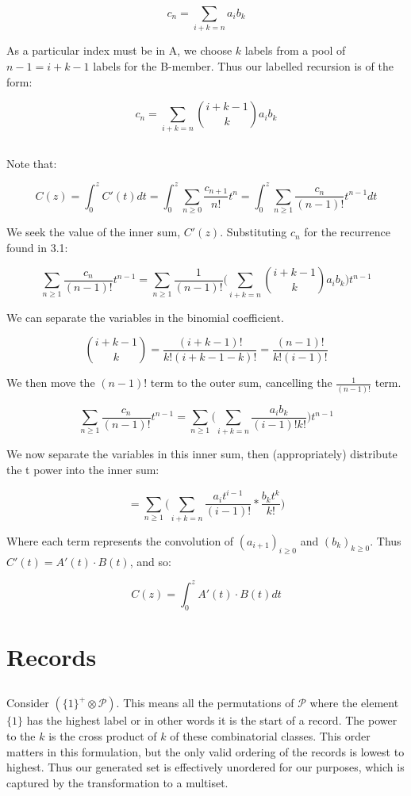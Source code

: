 \documentclass{article}
\begin{document}
$$c_n = \sum_{i + k = n} a_ib_k$$

As a particular index must be in A, we choose $k$ labels from a pool of $n-1 = i + k - 1$ labels for the B-member. Thus our labelled recursion is of the form:

$$c_n = \sum_{i + k = n} \binom{i + k - 1}{k}a_ib_k$$

\subsection{}

Note that:

$$C(z) =  \int_{0}^{z} C'(t) dt = \int_{0}^{z} \sum_{n \ge 0} \frac{c_{n+1}}{n!}t^{n}  = \int_{0}^{z} \sum_{n \ge 1} \frac{c_n}{(n-1)!}t^{n-1}  dt$$ 

We seek the value of the inner sum, $C'(z)$. Substituting $c_n$ for the recurrence found in 3.1:

$$\sum_{n \ge 1}\frac{c_n}{(n-1)!}t^{n-1}  = \sum_{n \ge 1}\frac{1}{(n-1)!} \bigg( \sum_{i + k = n} \binom{i + k - 1}{k}a_ib_k\bigg)t^{n-1}$$

We can separate the variables in the binomial coefficient.

$$\binom{i + k - 1}{k} = \frac{(i+k-1)!}{k!(i + k - 1 - k)!} = \frac{(n-1)!}{k!(i-1)!} $$

We then move the $(n-1)!$ term to the outer sum, cancelling the $\frac{1}{(n-1)!}$ term.

$$\sum_{n \ge 1}\frac{c_n}{(n-1)!}t^{n-1}  = \sum_{n \ge 1} \bigg( \sum_{i + k = n} \frac{a_ib_k}{(i-1)!k!}\bigg)t^{n-1}$$

We now separate the variables in this inner sum, then (appropriately) distribute the t power into the inner sum:

$$ = \sum_{n \ge 1} \bigg( \sum_{i + k = n} \frac{a_it^{i-1}}{(i-1)!} * \frac{b_kt^k}{k!}\bigg)$$

Where each term represents the convolution of $(a_{i+1})_{i \ge 0}$ and $(b_{k})_{k \ge 0}$. Thus $C'(t) = A'(t) \cdot B(t)$, and so:

$$C(z) = \int_{0}^{z} A'(t) \cdot B(t) dt$$

\section{Records}

\subsection{}
Consider $(\{1\}^+\otimes \mathcal{P})$. This means all the permutations of $\mathcal{P}$ where the element $\{1\}$ has the highest label or in other words it is the start of a record. The power to the $k$ is the cross product of $k$ of these combinatorial classes. This order matters in this formulation, but the only valid ordering of the records is lowest to highest. Thus our generated set is effectively unordered for our purposes, which is captured by the transformation to a multiset. 
\end{document}
